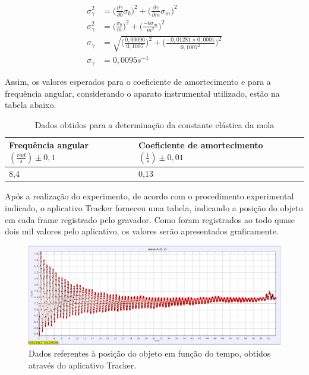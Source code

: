 \documentclass[12pt]{article}
\begin{document}
		\begin{align}
			\sigma_{\gamma}^2 &= \biggr(\frac{\partial\gamma}{\partial b}\sigma_b\biggl)^2 + \biggr(\frac{\partial\gamma}{\partial m}\sigma_m\biggl)^2 \nonumber \\
			\sigma_{\gamma}^2 &= \biggr(\frac{\sigma_b}{m}\biggl)^2 + \biggr(\frac{-b\sigma_m}{m^2}\biggl)^2 \nonumber \\
			\sigma_\gamma &= \sqrt{\biggr(\frac{0,00096}{0,1007}\biggl)^2 + \biggr(\frac{-0,01281\times 0,0001}{0,1007^2}\biggl)^2} \nonumber \\
			\sigma_\gamma &= 0,0095 s^{-1} \nonumber
		\end{align}
		
		Assim, os valores esperados para o coeficiente de amortecimento e para a frequência angular, considerando o aparato instrumental utilizado, estão na tabela abaixo.
		\begin{table}[H]
			\centering
			\begin{tabular}{|l|l|}
				\hline
				Frequência angular $(\frac{rad}{s}) \pm 0,1$ & Coeficiente de amortecimento $(\frac{1}{s}) \pm 0,01$ \\ \hline
				8,4              & 0,13 \\ \hline
			\end{tabular}
			\caption{Dados obtidos para a determinação da constante elástica da mola
			}
			\label{tab:table1}
		\end{table}		
		
		Após a realização do experimento, de acordo com o procedimento experimental indicado, o aplicativo Tracker forneceu uma tabela, indicando a posição do objeto em cada frame registrado pelo gravador. Como foram registrados ao todo quase dois mil valores pelo aplicativo, os valores serão apresentados graficamente.
		
		\begin{figure}[H]
			\centering
			\includegraphics[width=13cm]{figura_3.png}
			\caption{Dados referentes à posição do objeto em função do tempo, obtidos através do aplicativo Tracker.}
			\label{fig:figura3}
		\end{figure}
	
\end{document}
